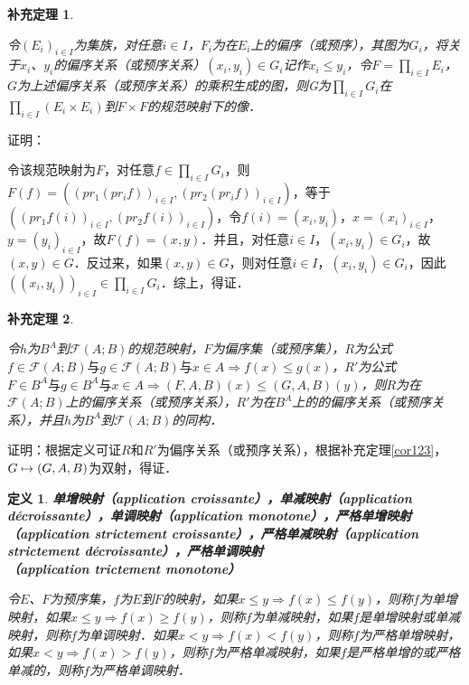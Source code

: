 \documentclass[12pt, a4paper, oneside]{book}
\newtheorem{cor}{补充定理}
\newtheorem{de}{定义}
\begin{document}
			\begin{cor}\label{cor162}
				\hfill\par
				令$(E_i)_{i\in I}$为集族，对任意$i\in I$，$F_i$为在$E_i$上的偏序（或预序），其图为$G_i$，将关于$x_i$、$y_i$的偏序关系（或预序关系）$(x_i, y_i)\in G_i$记作$x_i\leq y_i$，令$F=\prod\limits_{i\in I}E_i$，$G$为上述偏序关系（或预序关系）的乘积生成的图，则G为$\prod\limits_{i\in I}G_i$在$\prod\limits_{i\in I}(E_i\times E_i)$到$F\times F$的规范映射下的像．
			\end{cor}
			证明：
			\par
			令该规范映射为$F$，对任意$f\in \prod\limits_{i\in I}G_i$，则$F(f)=((pr_1(pr_if))_{i\in I}, (pr_2(pr_if))_{i\in I})$，等于$((pr_1f(i))_{i\in I}, (pr_2f(i))_{i\in I})$，令$f(i)=(x_i, y_i)$，$x=(x_i)_{i\in I}$，$y=(y_i)_{i\in I}$，故$F(f)=(x, y)$．并且，对任意$i \in I$，$(x_i, y_i)\in G_i$，故$(x, y)\in G$．反过来，如果$(x, y)\in G$，则对任意$i\in I$，$(x_i, y_i)\in G_i$，因此$((x_i, y_i))_{i\in I}\in \prod\limits_{i\in I}G_i$．综上，得证．
						
			\begin{cor}\label{cor163}
				\hfill\par
				令$h$为$B^A$到$\mathcal{F}(A; B)$的规范映射，$F$为偏序集（或预序集），$R$为公式$f\in \mathcal{F}(A; B)\text{与}g\in \mathcal{F}(A; B)\text{与} x\in A\Rightarrow f(x)\leq g(x)$，$R'$为公式$F\in B^A\text{与}g\in B^A\text{与}x\in A\Rightarrow (F, A, B)(x)\leq (G, A, B)(y)$，则$R$为在$\mathcal{F}(A; B)$上的偏序关系（或预序关系），$R'$为在$B^A$上的的偏序关系（或预序关系），并且$h$为$B^A$到$\mathcal{F}(A; B)$的同构．
			\end{cor}
			证明：根据定义可证$R$和$R'$为偏序关系（或预序关系），根据补充定理\ref{cor123}，$G\mapsto \\(G, A, B)$为双射，得证．

			\begin{de}
				\textbf{单增映射（application croissante），单减映射（application décroissante），单调映射（application monotone），严格单增映射（application strictement croissante），严格单减映射（application strictement décroissante），严格单调映射\\（application trictement monotone）}
				\par
				令$E$、$F$为预序集，$f$为$E$到$F$的映射，如果$x\leq y\Rightarrow f(x)\leq f(y)$，则称$f$为单增映射，如果$x\leq y\Rightarrow f(x)\geq f(y)$，则称$f$为单减映射，如果$f$是单增映射或单减映射，则称$f$为单调映射．如果$x<y\Rightarrow f(x)<f(y)$，则称$f$为严格单增映射，如果$x<y\Rightarrow f(x)>f(y)$，则称$f$为严格单减映射，如果$f$是严格单增的或严格单减的，则称$f$为严格单调映射．
			\end{de}
						
\end{document}
